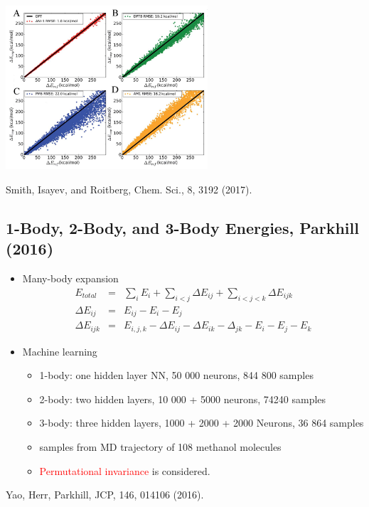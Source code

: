 \documentclass[handout]{beamer} %
\begin{document}
\begin{frame}
\begin{center}
\includegraphics[height=2.4in]{figures_ml/Roitberg_scatter.png}
\end{center}
\vspace{5mm}
\begin{center}
\footnotesize{Smith, Isayev, and Roitberg, Chem. Sci., 8, 3192 (2017).}
\end{center} 
\end{frame}

\subsection{1-Body, 2-Body, and 3-Body Energies, Parkhill (2016)}

\begin{frame}
\begin{itemize}
\item \footnotesize{Many-body expansion}
\begin{eqnarray*}
E_{total} & = & \sum_{i} E_i + \sum_{i < j} \Delta E_{ij} + \sum_{ i < j < k } \Delta E_{ijk} \\
\Delta E_{ij} & = & E_{ij} - E_i - E_j \\
\Delta E_{ijk} & =  & E_{i,j,k} - \Delta E_{ij} - \Delta E_{ik} - \Delta_{jk} - E_i - E_j - E_k 
\end{eqnarray*}
\item Machine learning 
\begin{itemize}
\item \footnotesize{1-body: one hidden layer NN, 50 000 neurons, 844 800 samples}
\item 2-body: two hidden layers, 10 000 + 5000 neurons, 74240 samples
\item 3-body: three hidden layers, 1000 + 2000 + 2000 Neurons, 36 864 samples  
\item samples from MD trajectory of 108 methanol molecules
\item \textcolor{red}{Permutational invariance} is considered. 
\end{itemize}

\end{itemize}

\vspace{10mm}
\begin{center}
\footnotesize{Yao, Herr, Parkhill, JCP, 146, 014106 (2016).}
\end{center} 
\end{frame}
\end{document}
